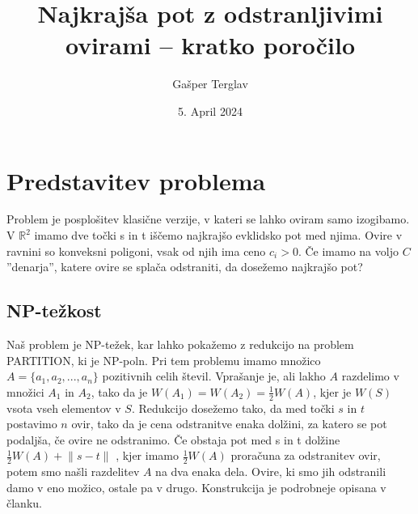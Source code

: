 \documentclass{article}
\author{Gašper Terglav}
\date{5. April 2024}
\title{Najkrajša pot z odstranljivimi ovirami -- kratko poročilo}
\begin{document}
\maketitle

\section*{Predstavitev problema}

Problem je posplošitev klasične verzije, v kateri se lahko oviram samo izogibamo. V $\mathbb{R}^2$ imamo dve točki s in t iščemo najkrajšo evklidsko pot med njima. Ovire v ravnini so konveksni poligoni, vsak od njih ima ceno $c_i > 0$. Če imamo na voljo $C$ ''denarja'', katere ovire se splača odstraniti, da dosežemo najkrajšo pot?

\subsection*{NP-težkost}

Naš problem je NP-težek, kar lahko pokažemo z redukcijo na problem PARTITION, ki je NP-poln. Pri tem problemu imamo množico $A = \{a_1, a_2, ..., a_n\}$ pozitivnih celih števil. Vprašanje je, ali lakho $A$ razdelimo v množici $A_1$ in $A_2$, tako da je $W(A_1) = W(A_2) = \frac{1}{2}W(A)$, kjer je $W(S)$ vsota vseh elementov v $S$. Redukcijo dosežemo tako, da med točki $s$ in $t$ postavimo $n$ ovir, tako da je cena odstranitve enaka dolžini, za katero se pot podaljša, če ovire ne odstranimo. Če obstaja pot med s in t dolžine $\frac{1}{2}W(A) + \lVert s - t \rVert$ , kjer imamo $\frac{1}{2}W(A)$ proračuna za odstranitev ovir, potem smo našli razdelitev $A$ na dva enaka dela. Ovire, ki smo jih odstranili damo v eno možico, ostale pa v drugo. Konstrukcija je podrobneje opisana v članku.
\end{document}
